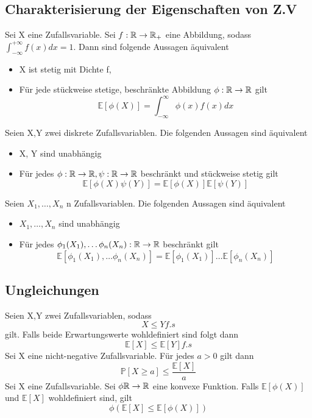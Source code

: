 \subsection{Charakterisierung der Eigenschaften von Z.V}
\Satz[4.16] \newline
Sei X eine Zufallsvariable. Sei \( f: \mathbb{R} \rightarrow \mathbb{R}_+ \) eine Abbildung, sodass \( \int_{-\infty}^{+ \infty} f(x)dx = 1\). Dann sind folgende Aussagen äquivalent
\begin{itemize}
    \item X ist stetig mit Dichte f,
    \item Für jede stückweise stetige, beschränkte Abbildung \(\phi: \mathbb{R} \rightarrow \mathbb{R} \) gilt \[ \mathbb{E}[\phi(X)] = \int_{-\infty}^{\infty}\phi (x) f(x)dx\]
\end{itemize}
\Theo[4.17] \newline
Seien X,Y zwei diskrete Zufallsvariablen. Die folgenden Aussagen sind äquivalent
\begin{itemize}
    \item X, Y sind unabhängig
    \item Für jedes \( \phi : \mathbb{R} \rightarrow \mathbb{R}, \psi : \mathbb{R} \rightarrow \mathbb{R} \) beschränkt und stückweise stetig gilt \[ \mathbb{E}[\phi(X)\psi(Y)] = \mathbb{E}[\phi(X)]\mathbb{E}[\psi(Y)]\]
\end{itemize}
\Theo[4.18] \newline
Seien \(X_1, \dots , X_n \) n Zufallsvariablen. Die folgenden Aussagen sind äquivalent
\begin{itemize}
    \item \(X_1, \dots , X_n \) sind unabhängig
    \item Für jedes \( \phi_1 (X_1), \dots \phi_n(X_n ) : \mathbb{R} \rightarrow \mathbb{R} \) beschränkt gilt \[\mathbb{E}[\phi_1(X_1), \dots \phi_n(X_n)] = \mathbb{E}[\phi_1(X_1)] \dots \mathbb{E}[\phi_n(X_n)]\]
\end{itemize}
\subsection{Ungleichungen}
\Satz[4.19] \newline
Seien X,Y zwei Zufallsvariablen, sodass \[ X \leq Y f.s\] gilt. Falls beide Erwartungswerte wohldefiniert sind folgt dann \[ \mathbb{E}[X] \leq \mathbb{E}[Y] f.s\]
 \newline
Sei X eine nicht-negative Zufallsvariable. Für jedes \( a > 0\) gilt dann \[ \mathbb{P}[X \geq a ] \leq \frac{\mathbb{E}[X]}{a}\]
 \newline
Sei X eine Zufallsvariable. Sei \( \phi \mathbb{R} \rightarrow \mathbb{R} \) eine konvexe Funktion. Falls \( \mathbb{E}[\phi(X)]\) und \( \mathbb{E}[X]\) wohldefiniert sind, gilt \[ \phi(\mathbb{E}[X] \leq \mathbb{E}[\phi(X)])\]
